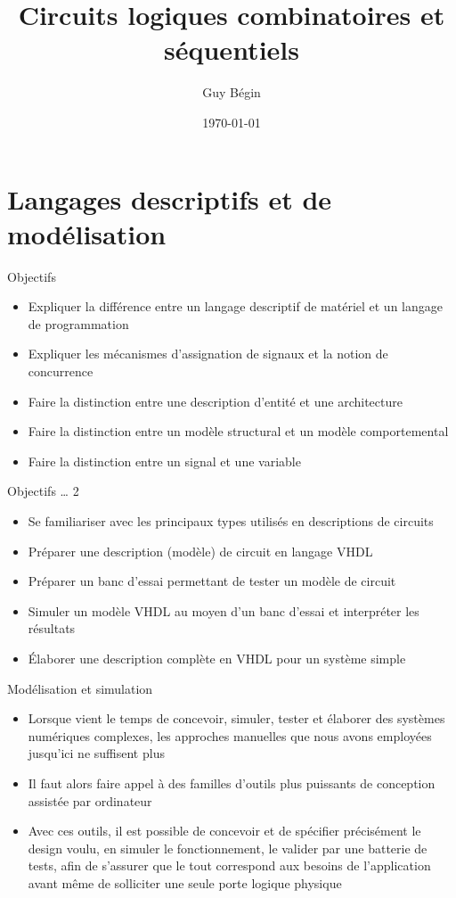 \documentclass[presentation]{beamer}
\author{Guy Bégin}
\date{\today}
\title{Circuits logiques combinatoires et séquentiels}
\begin{document}
\maketitle

\section{Langages descriptifs et de modélisation}
\label{sec:orgdcced18}

\begin{frame}[label={sec:orgb702ff5}]{Objectifs}
\begin{itemize}
\item Expliquer la différence entre un langage descriptif de matériel et un langage de programmation
\item Expliquer les mécanismes d'assignation de signaux et la notion de concurrence
\item Faire la distinction entre une description d'entité et une architecture
\item Faire la distinction entre un modèle structural et un modèle comportemental
\item Faire la distinction entre un signal et une variable
\end{itemize}
\end{frame}

\begin{frame}[label={sec:org79c2aa6}]{Objectifs \ldots{} 2}
\begin{itemize}
\item Se familiariser avec les principaux types utilisés en descriptions de circuits
\item Préparer une description (modèle) de circuit en langage VHDL
\item Préparer un banc d'essai permettant de tester un modèle de circuit
\item Simuler un modèle VHDL au moyen d'un banc d'essai et interpréter les résultats
\item Élaborer une description complète en VHDL pour un système simple
\end{itemize}
\end{frame}

\begin{frame}[label={sec:org1648a2d}]{Modélisation et simulation}
\begin{itemize}
\item Lorsque vient le temps de concevoir, simuler, tester et élaborer des systèmes numériques complexes, les approches manuelles que nous avons employées jusqu'ici ne suffisent plus
\item Il faut alors faire appel à des familles d'outils plus puissants de conception assistée par ordinateur
\item Avec ces outils, il est possible de concevoir et de spécifier précisément le design voulu, en simuler le fonctionnement, le valider par une batterie de tests, afin de s'assurer que le tout correspond aux besoins de l'application avant même de solliciter une seule porte logique physique
\end{itemize}
\end{frame}
\end{document}
